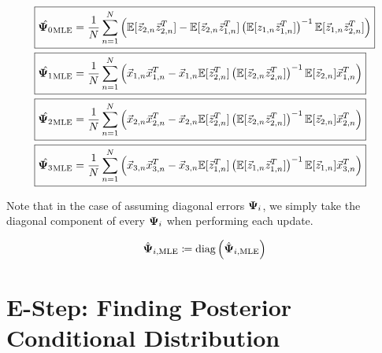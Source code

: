 \begin{align*}
\Aboxed{ \hat{\bpsi_0}_{\text{MLE}} &=  \frac{1}{N}  \sum_{n=1}^N \left( \ev[\z_{2,n} \z_{2,n}^T] -  \ev [\z_{2,n} \z_{1,n}^T]
                             \left( \ev [z_{1,n} \z_{1,n}^T ] \right)^{-1} \ev[
                                      \z_{1,n} \z_{2,n}^T] \right) }\\
\Aboxed{   \hat{\bpsi_1}_{\text{MLE}} &=\frac{1}{N}  \sum_{n=1}^N  \left( \x_{1,n} \x_{1,n}^T - \x_{1,n} \ev[\z_{2,n}^T]
                                        \left( \ev [\z_{2,n} \z_{2,n}^T
                                        ]\right)^{-1} \ev[\z_{2,n}]
                               \x_{1,n}^T \right)}\\
  \Aboxed{   \hat{\bpsi_2}_{\text{MLE}} &= \frac{1}{N}  \sum_{n=1}^N  \left( \x_{2,n} \x_{2,n}^T - \x_{2,n} \ev[\z_{2,n}^T]
                                        \left( \ev [\z_{2,n} \z_{2,n}^T
                                        ]\right)^{-1} \ev[\z_{2,n}]
                                 \x_{2,n}^T \right)}\\
    \Aboxed{   \hat{\bpsi_3}_{\text{MLE}} &= \frac{1}{N}  \sum_{n=1}^N
                                            \left( \x_{3,n} \x_{3,n}^T - \x_{3,n} \ev[\z_{1,n}^T]
                                        \left( \ev [\z_{1,n} \z_{1,n}^T
                                        ]\right)^{-1} \ev[\z_{1,n}] \x_{3,n}^T
                                            \right)}\\
\end{align*}

Note that in the case of assuming diagonal errors $\bold{\Psi}_i$, we simply
take the diagonal component of every $\bold{\Psi}_i$ when performing each
update. 

\begin{align}
  \hat{\bold{\Psi}}_{i, \text{MLE}} \coloneqq \text{diag}
  \left(\hat{\bold{\Psi}}_{i, \text{MLE}} \right)
\end{align}
\pagebreak
\section{E-Step: Finding Posterior Conditional Distribution}


